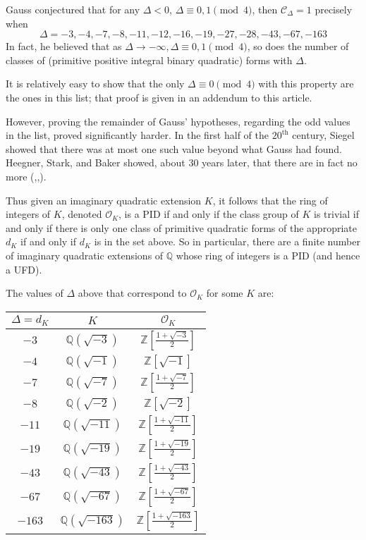 \documentclass[12pt]{article}
\newcommand{\Ints}{\mathbb{Z}}
\newcommand{\Rats}{\mathbb{Q}}
\newcommand{\Alg}{\mathcal{O}}
\theoremstyle{definition}
\begin{document}
Gauss conjectured that for any $\Delta<0$, $\Delta\equiv 0,1\pmod 4$, then $\mathcal{C}_{\Delta}=1$ precisely when
\[
\Delta = -3,-4,-7,-8,-11,-12,-16,-19,-27,-28,-43,-67,-163
\]
In fact, he believed that as $\Delta \rightarrow -\infty, \Delta\equiv 0,1\pmod 4$, so does the number of classes of (primitive positive integral binary quadratic) forms with  $\Delta$.

It is relatively easy to show that the only $\Delta\equiv 0\pmod 4$ with this property are the ones in this list; that proof is given in an addendum to this article.

However, proving the remainder of Gauss' hypotheses, regarding the odd values in the list, proved significantly harder. In the first half of the $20^{\mathrm{th}}$ century, Siegel showed that there was at most one such value beyond what Gauss had found. Heegner, Stark, and Baker showed, about $30$ years later, that there are in fact no more (\cite{bib:Heegner},\cite{bib:Stark},\cite{bib:Baker}). 

Thus given an imaginary quadratic extension $K$, it follows that the ring of integers of $K$, denoted $\Alg_K$, is a PID if and only if the class group of $K$ is trivial if and only if there is only one class of primitive quadratic forms of the appropriate  $d_K$ if and only if $d_K$ is in the set above. So in particular, there are a finite number of imaginary quadratic extensions of $\Rats$ whose ring of integers is a PID (and hence a UFD).

The values of $\Delta$ above that correspond to $\Alg_K$ for some $K$ are:
\begin{center}
\begin{tabular}{c|c|c}
$\Delta=d_K$ & $K$ & $\Alg_K$\\
	\hline
$-3$& $\Rats(\sqrt{-3})$ & $\Ints\left[\frac{1+\sqrt{-3}}{2}\right]$\\
$-4$ & $\Rats(\sqrt{-1})$ & $\Ints[\sqrt{-1}]$\\
$-7$ & $\Rats(\sqrt{-7})$ & $\Ints\left[\frac{1+\sqrt{-7}}{2}\right]$\\
$-8$ & $\Rats(\sqrt{-2})$ & $\Ints[\sqrt{-2}]$\\
$-11$ & $\Rats(\sqrt{-11})$ & $\Ints\left[\frac{1+\sqrt{-11}}{2}\right]$\\
$-19$ & $\Rats(\sqrt{-19})$ & $\Ints\left[\frac{1+\sqrt{-19}}{2}\right]$\\
$-43$ & $\Rats(\sqrt{-43})$ & $\Ints\left[\frac{1+\sqrt{-43}}{2}\right]$\\
$-67$ & $\Rats(\sqrt{-67})$ & $\Ints\left[\frac{1+\sqrt{-67}}{2}\right]$\\
$-163$ & $\Rats(\sqrt{-163})$ & $\Ints\left[\frac{1+\sqrt{-163}}{2}\right]$
\end{tabular}
\end{center}
\end{document}
